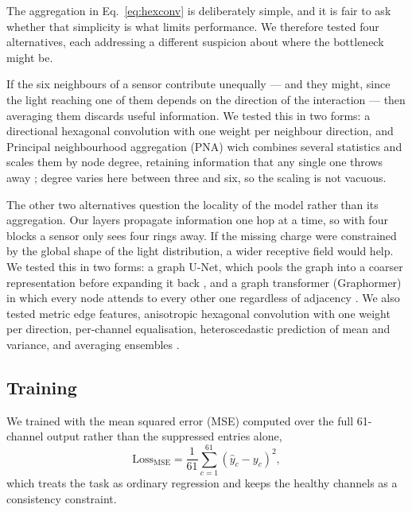 \documentclass[10pt,conference]{IEEEtran}
\begin{document}
The aggregation in Eq.~\ref{eq:hexconv} is deliberately simple, and it is fair
to ask whether that simplicity is what limits performance. We therefore tested
four alternatives, each addressing a different suspicion about where the
bottleneck might be.

If the six neighbours of a sensor contribute unequally --- and they might, since
the light reaching one of them depends on the direction of the interaction ---
then averaging them discards useful information. 
We tested this in two forms: a directional hexagonal convolution with one weight per neighbour direction,
and Principal neighbourhood aggregation (PNA) wich combines several statistics and
scales them by node degree, retaining information that any single one throws
away \cite{corso2020pna}; degree varies here between three and six, so the
scaling is not vacuous.

The other two alternatives question the locality of the model rather than its
aggregation. Our layers propagate information one hop at a time, so with four
blocks a sensor only sees four rings away. If the missing charge were
constrained by the global shape of the light distribution, a wider receptive
field would help. We tested this in two forms: a graph U-Net, which pools the
graph into a coarser representation before expanding it back
\cite{gao2019graphunet}, and a graph transformer (Graphormer) in which every
node attends to every other one regardless of adjacency
\cite{ying2021graphormer}. We also tested metric edge features, anisotropic
hexagonal convolution with one weight per direction, per-channel equalisation,
heteroscedastic prediction of mean and variance, and averaging ensembles
\cite{lakshminarayanan2017ensembles}.

\subsection{Training}
\label{sec:training}

We trained with the mean squared error (MSE) computed over the full 61-channel
output rather than the suppressed entries alone,
%
\begin{equation}
\mathrm{Loss}_{\mathrm{MSE}} = \frac{1}{61} \sum_{c=1}^{61}
              \left( \hat{y}_{c} - y_{c} \right)^{2},
\label{eq:loss}
\end{equation}
%
which treats the task as ordinary regression and keeps the healthy channels as
a consistency constraint.
\end{document}
